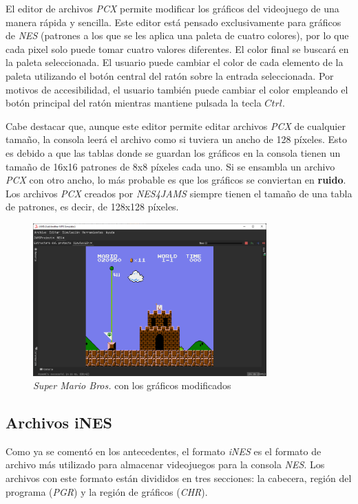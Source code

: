 El editor de archivos \textit{PCX} permite modificar los
gráficos del videojuego de una manera rápida y sencilla.
Este editor está pensado exclusivamente para gráficos
de \textit{NES} (patrones a los que se les aplica una
paleta de cuatro colores), por lo que cada pixel solo puede tomar
cuatro valores diferentes.
El color final se buscará en la paleta seleccionada.
El usuario puede cambiar el color de cada elemento de la
paleta utilizando el botón central del ratón sobre
la entrada seleccionada.
Por motivos de accesibilidad, el usuario también puede
cambiar el color empleando el botón principal del
ratón mientras mantiene pulsada la tecla $Ctrl$.

Cabe destacar que, aunque este editor permite editar
archivos \textit{PCX} de cualquier tamaño, la consola
leerá el archivo como si tuviera un ancho de 128 píxeles.
Esto es debido a que las tablas donde se guardan los gráficos
en la consola tienen un tamaño de 16x16 patrones
de 8x8 píxeles cada uno.
Si se ensambla un archivo \textit{PCX} con otro ancho,
lo más probable es que los gráficos se conviertan en
\textbf{ruido}.
Los archivos \textit{PCX} creados por \textit{NES4JAMS}
siempre tienen el tamaño de una tabla de patrones,
es decir, de 128x128 píxeles.

\begin{figure}[h]
    \centering
    \includegraphics[width=0.8\textwidth]{images/nes/nes-graphics-change}
    \caption{\textit{Super Mario Bros.} con los gráficos modificados}
    \label{fig:nes-graphics-change}
\end{figure}

\subsection{Archivos iNES}\label{subsec:archivos-nes}

Como ya se comentó en los antecedentes,
el formato \textit{iNES} es el formato de archivo más utilizado
para almacenar videojuegos para la consola \textit{NES}.
Los archivos con este formato están divididos en tres secciones:
la cabecera, región del programa (\textit{PGR}) y la región de gráficos (\textit{CHR}).

